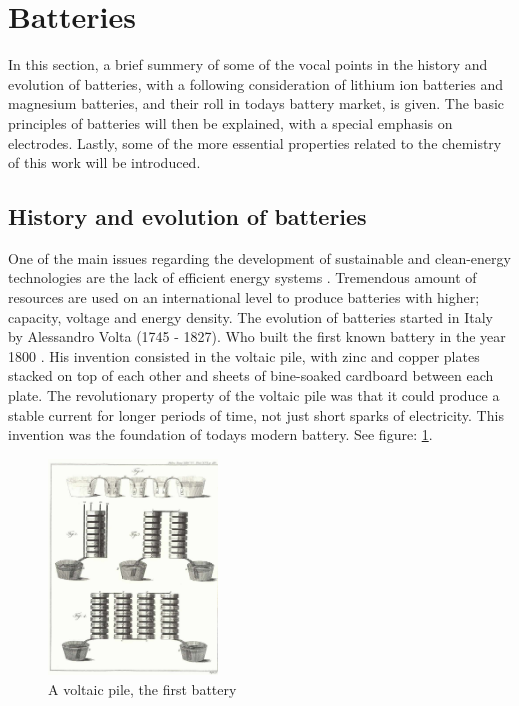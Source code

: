 \section{Batteries}
	In this section, a brief summery of some of the vocal points in the history and evolution of batteries, with a following consideration of lithium ion batteries and magnesium batteries, and their roll in todays battery market, is given. The basic principles of batteries will then be explained, with a special emphasis on electrodes. Lastly, some of the more essential properties related to the chemistry of this work will be introduced. 

\subsection{History and evolution of batteries}
One of the main issues regarding the development of sustainable and clean-energy technologies are the lack of efficient energy systems \cite{curtarolo2013high}. Tremendous amount of resources are used on an international level to produce batteries with higher; capacity, voltage and energy density. The evolution of batteries started in Italy by Alessandro Volta (1745 - 1827). Who built the first known battery in the year 1800 \cite{volta1800electricity}. His invention consisted in the voltaic pile, with zinc and copper plates stacked on top of each other and sheets of  bine-soaked cardboard between each plate. The revolutionary property of the voltaic pile was that it could produce a stable current for longer periods of time, not just short sparks of electricity. This invention was the foundation of todays modern battery. See figure: \ref{fig:voltaicpile}.

\begin{figure}[ht]
    \centering
    \includegraphics[width=0.4\textwidth]{volta.jpg}
    \caption{A voltaic pile, the first battery \cite{decker2005volta}}
    \label{fig:voltaicpile}
\end{figure}

